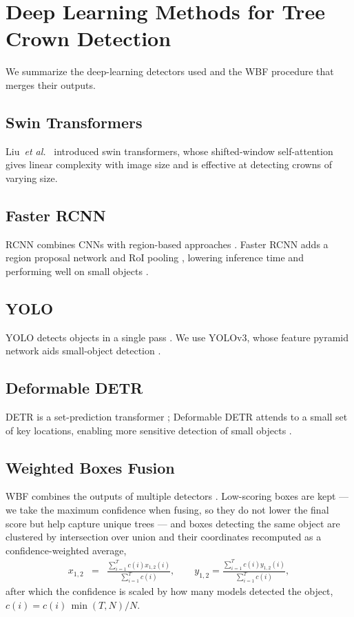 \documentclass{article}
\begin{document}
\section{Deep Learning Methods for Tree Crown Detection}\label{sec:deep_learning_models}

We summarize the deep-learning detectors used and the WBF procedure that merges their outputs.

\subsection{Swin Transformers}
Liu~\emph{et al.}~\cite{liu2021swin} introduced swin transformers, whose shifted-window self-attention gives linear complexity with image size and is effective at detecting crowns of varying size.

\subsection{Faster RCNN}
RCNN combines CNNs with region-based approaches \cite{girshick2014rich}. Faster RCNN adds a region proposal network and RoI pooling \cite{ren2015faster}, lowering inference time and performing well on small objects \cite{nguyen2020evaluation,liu2021survey}.

\subsection{YOLO}
YOLO detects objects in a single pass \cite{redmon2016you}. We use YOLOv3, whose feature pyramid network aids small-object detection \cite{redmon2018yolov3, wang2022remote}.

\subsection{Deformable DETR}
DETR is a set-prediction transformer \cite{carion2020end}; Deformable DETR attends to a small set of key locations, enabling more sensitive detection of small objects \cite{zhu2020deformable}.

\subsection{Weighted Boxes Fusion}
WBF combines the outputs of multiple detectors \cite{solovyev2021weighted}. Low-scoring boxes are kept --- we take the maximum confidence when fusing, so they do not lower the final score but help capture unique trees --- and boxes detecting the same object are clustered by intersection over union and their coordinates recomputed as a confidence-weighted average,
\begin{eqnarray}
  x_{1,2} &=& \frac{\sum_{i=1}^{T} c(i) x_{1,2}(i)}{\sum_{i=1}^{T} c(i)}, \qquad
  y_{1,2} = \frac{\sum_{i=1}^{T} c(i) y_{1,2}(i)}{\sum_{i=1}^{T} c(i)},
\end{eqnarray}
after which the confidence is scaled by how many models detected the object, $c(i) = c(i)\,\min(T,N)/N$.
\end{document}
